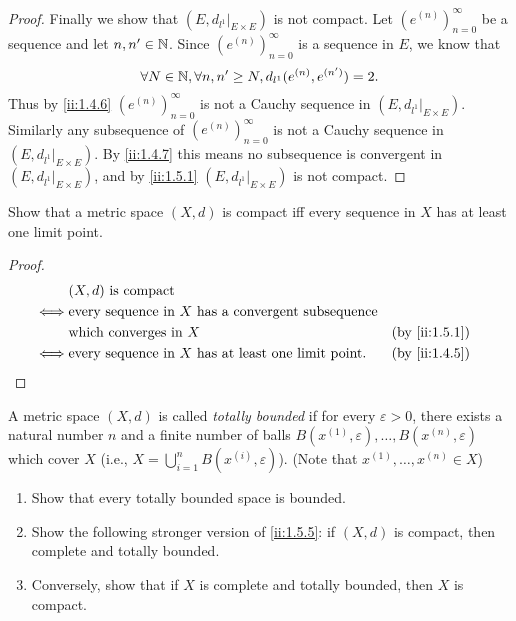 \begin{proof}
  Finally we show that \((E, d_{l^1}|_{E \times E})\) is not compact.
  Let \((e^{(n)})_{n = 0}^\infty\) be a sequence and let \(n, n' \in \mathbb{N}\).
  Since \((e^{(n)})_{n = 0}^\infty\) is a sequence in \(E\), we know that
  \[
    \forall N \in \mathbb{N}, \forall n, n' \geq N, d_{l^1}(e^{(n)}, e^{(n')}) = 2.
  \]
  Thus by \cref{ii:1.4.6} \((e^{(n)})_{n = 0}^\infty\) is not a Cauchy sequence in \((E, d_{l^1}|_{E \times E})\).
  Similarly any subsequence of \((e^{(n)})_{n = 0}^\infty\) is not a Cauchy sequence in \((E, d_{l^1}|_{E \times E})\).
  By \cref{ii:1.4.7} this means no subsequence is convergent in \((E, d_{l^1}|_{E \times E})\), and by \cref{ii:1.5.1} \((E, d_{l^1}|_{E \times E})\) is not compact.
\end{proof}

\begin{ex}\label{ii:ex:1.5.9}
  Show that a metric space \((X, d)\) is compact iff every sequence in \(X\) has at least one limit point.
\end{ex}

\begin{proof}
  \begin{align*}
         & (X, d) \text{ is compact}                                                            \\
    \iff & \text{every sequence in } X \text{ has a convergent subsequence}                     \\
         & \text{which converges in } X                                      &  & \by{ii:1.5.1} \\
    \iff & \text{every sequence in } X \text{ has at least one limit point}. &  & \by{ii:1.4.5}
  \end{align*}
\end{proof}

\begin{ex}\label{ii:ex:1.5.10}
  A metric space \((X, d)\) is called \emph{totally bounded} if for every \(\varepsilon > 0\), there exists a natural number \(n\) and a finite number of balls \(B(x^{(1)}, \varepsilon), \dots, B(x^{(n)}, \varepsilon)\) which cover \(X\) (i.e., \(X = \bigcup_{i = 1}^n B(x^{(i)}, \varepsilon)\)).
  (Note that \(x^{(1)}, \dots, x^{(n)} \in X\))
  \begin{enumerate}
    \item Show that every totally bounded space is bounded.
    \item Show the following stronger version of \cref{ii:1.5.5}:
          if \((X, d)\) is compact, then complete and totally bounded.
    \item Conversely, show that if \(X\) is complete and totally bounded, then \(X\) is compact.
  \end{enumerate}
\end{ex}

